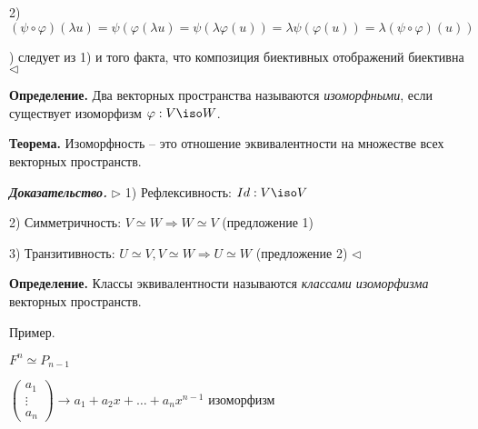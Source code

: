2) $(\psi \circ \varphi) (\lambda u) = \psi (\varphi (\lambda u) = \psi (\lambda \varphi (u)) = \lambda \psi (\varphi(u)) = \lambda (\psi \circ \varphi) (u))$

) следует из 1) и того факта, что композиция биективных отображений биективна $\lhd$

\bigskip
\textbf{Определение.} Два векторных пространства называются \textit{изоморфными}, если существует изоморфизм $\varphi : V \iso W$. 

\bigskip
\textbf{Теорема.} Изоморфность -- это отношение эквивалентности на множестве всех векторных пространств.

\bigskip
\textbf{\textit{Доказательство.}} $\rhd$ 1) Рефлексивность: $Id: V \iso V$

2) Симметричность: $V \simeq W \Rightarrow W \simeq V$ (предложение 1)

3) Транзитивность: $U \simeq V, V \simeq W \Rightarrow U \simeq W$ (предложение 2) $\lhd$

\bigskip
\textbf{Определение.} Классы эквивалентности называются \textit{классами изоморфизма} векторных пространств.

\bigskip
Пример. 

$F^n \simeq P_{n-1}$

$\begin{pmatrix} a_1 \\ \vdots \\ a_n \end{pmatrix} \rightarrow a_1 + a_2 x + \dots + a_n x^{n-1}$ изоморфизм

\bigskip
